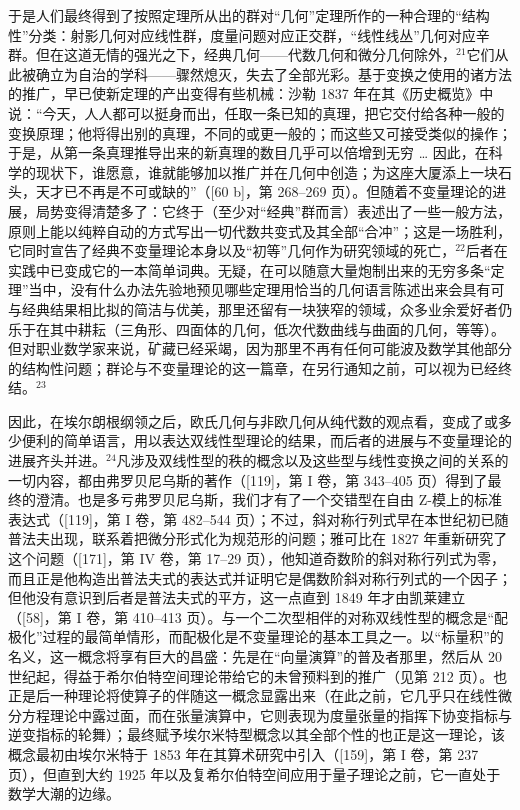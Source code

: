 于是人们最终得到了按照定理所从出的群对“几何”定理所作的一种合理的“结构性”分类：射影几何对应线性群，度量问题对应正交群，“线性线丛”几何对应辛群。但在这道无情的强光之下，经典几何——代数几何和微分几何除外，\(^{21}\)它们从此被确立为自治的学科——骤然熄灭，失去了全部光彩。基于变换之使用的诸方法的推广，早已使新定理的产出变得有些机械：沙勒 1837 年在其《历史概览》中说：“今天，人人都可以挺身而出，任取一条已知的真理，把它交付给各种一般的变换原理；他将得出别的真理，不同的或更一般的；而这些又可接受类似的操作；于是，从第一条真理推导出来的新真理的数目几乎可以倍增到无穷 \ldots{} 因此，在科学的现状下，谁愿意，谁就能够加以推广并在几何中创造；为这座大厦添上一块石头，天才已不再是不可或缺的”（{[}60 b{]}，第 268–269 页）。但随着不变量理论的进展，局势变得清楚多了：它终于（至少对“经典”群而言）表述出了一些一般方法，原则上能以纯粹自动的方式写出一切代数共变式及其全部“合冲”；这是一场胜利，它同时宣告了经典不变量理论本身以及“初等”几何作为研究领域的死亡，\(^{22}\)后者在实践中已变成它的一本简单词典。无疑，在可以随意大量炮制出来的无穷多条“定理”当中，没有什么办法先验地预见哪些定理用恰当的几何语言陈述出来会具有可与经典结果相比拟的简洁与优美，那里还留有一块狭窄的领域，众多业余爱好者仍乐于在其中耕耘（三角形、四面体的几何，低次代数曲线与曲面的几何，等等）。但对职业数学家来说，矿藏已经采竭，因为那里不再有任何可能波及数学其他部分的结构性问题；群论与不变量理论的这一篇章，在另行通知之前，可以视为已经终结。\(^{23}\)

因此，在埃尔朗根纲领之后，欧氏几何与非欧几何从纯代数的观点看，变成了或多少便利的简单语言，用以表达双线性型理论的结果，而后者的进展与不变量理论的进展齐头并进。\(^{24}\)凡涉及双线性型的秩的概念以及这些型与线性变换之间的关系的一切内容，都由弗罗贝尼乌斯的著作（{[}119{]}，第 I 卷，第 343–405 页）得到了最终的澄清。也是多亏弗罗贝尼乌斯，我们才有了一个交错型在自由 Z-模上的标准表达式（{[}119{]}，第 I 卷，第 482–544 页）；不过，斜对称行列式早在本世纪初已随普法夫出现，联系着把微分形式化为规范形的问题；雅可比在 1827 年重新研究了这个问题（{[}171{]}，第 IV 卷，第 17–29 页），他知道奇数阶的斜对称行列式为零，而且正是他构造出普法夫式的表达式并证明它是偶数阶斜对称行列式的一个因子；但他没有意识到后者是普法夫式的平方，这一点直到 1849 年才由凯莱建立（{[}58{]}，第 I 卷，第 410–413 页）。与一个二次型相伴的对称双线性型的概念是“配极化”过程的最简单情形，而配极化是不变量理论的基本工具之一。以“标量积”的名义，这一概念将享有巨大的昌盛：先是在“向量演算”的普及者那里，然后从 20 世纪起，得益于希尔伯特空间理论带给它的未曾预料到的推广（见第 212 页）。也正是后一种理论将使算子的伴随这一概念显露出来（在此之前，它几乎只在线性微分方程理论中露过面，而在张量演算中，它则表现为度量张量的指挥下协变指标与逆变指标的轮舞）；最终赋予埃尔米特型概念以其全部个性的也正是这一理论，该概念最初由埃尔米特于 1853 年在其算术研究中引入（{[}159{]}，第 I 卷，第 237 页），但直到大约 1925 年以及复希尔伯特空间应用于量子理论之前，它一直处于数学大潮的边缘。


